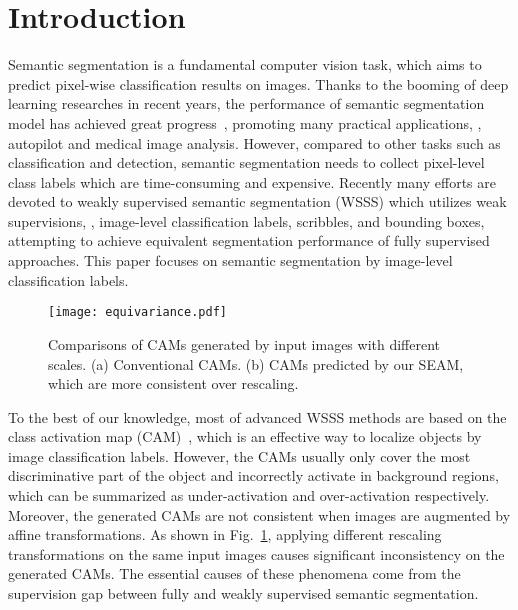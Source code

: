 \documentclass[10pt,twocolumn,letterpaper]{article}
\begin{document}
\section{Introduction}
	
	Semantic segmentation is a fundamental computer vision task, which aims to predict pixel-wise classification results on images. Thanks to the booming of deep learning researches in recent years, the performance of semantic segmentation model has achieved great progress~\cite{DeepLabv2, FCN, PSPNet}, promoting many practical applications, \eg, autopilot and medical image analysis. However, compared to other tasks such as classification and detection, semantic segmentation needs to collect pixel-level class labels which are time-consuming and expensive. Recently many efforts are devoted to weakly supervised semantic segmentation (WSSS) which utilizes weak supervisions, \eg, image-level classification labels, scribbles, and bounding boxes, attempting to achieve equivalent segmentation performance of fully supervised approaches. This paper focuses on semantic segmentation by image-level classification labels.
	
	\begin{figure}[t]
		\centering
		\texttt{[image: equivariance.pdf]}
		\caption{Comparisons of CAMs generated by input images with different scales. (a) Conventional CAMs. (b) CAMs predicted by our SEAM, which are more consistent over rescaling.}
		\label{fig:illustration}
\end{figure}
	
	To the best of our knowledge, most of advanced WSSS methods are based on the class activation map (CAM)~\cite{CAM}, which is an effective way to localize objects by image classification labels. However, the CAMs usually only cover the most discriminative part of the object and incorrectly activate in background regions, which can be summarized as under-activation and over-activation respectively. Moreover, the generated CAMs are not consistent when images are augmented by affine transformations. As shown in Fig.~\ref{fig:illustration}, applying different rescaling transformations on the same input images causes significant inconsistency on the generated CAMs. The essential causes of these phenomena come from the supervision gap between fully and weakly supervised semantic segmentation.
	
\end{document}
